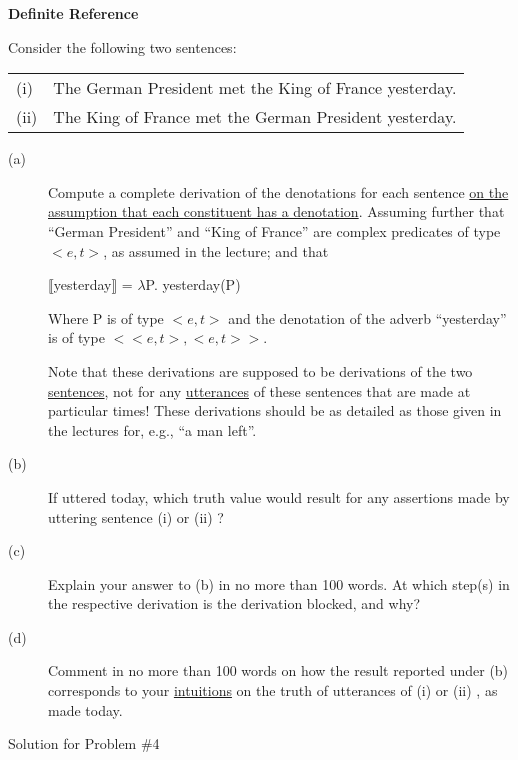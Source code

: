 \documentclass[11pt]{article}
\begin{document}
\begin{problem}{4}
\textbf{Definite Reference}

Consider the following two sentences:

\begin{tabular}{l l}
(i) & The German President met the King of France yesterday. \\
(ii) & The King of France met the German President yesterday. \\
\end{tabular}

\begin{description}
    \item[(a)] Compute a complete derivation of the denotations for each sentence \uline{on the assumption that each constituent has a denotation}. Assuming further that ``German President'' and ``King of France'' are complex predicates of type $<e,t>$, as assumed in the lecture; and that 

    \begin{center}
    $\llbracket$yesterday$\rrbracket$ = $\lambda$P. yesterday(P) 
    \end{center}

    Where P is of type $<e,t>$ and the denotation of the adverb ``yesterday'' is of type $<<e,t>,<e,t>>$.

    Note that these derivations are supposed to be derivations of the two \uline{sentences}, not for any \uline{utterances} of these sentences that are made at particular times!  These derivations should be as detailed as those given in the lectures for, e.g., ``a man left''.

    \item[(b)] If uttered today, which truth value would result for any assertions made by uttering sentence (i) or (ii) ?
    \item[(c)] Explain your answer to (b) in no more than 100 words. At which step(s) in the respective derivation is the derivation blocked, and why?
    \item[(d)] Comment in no more than 100 words on how the result reported under (b) corresponds
to your \uline{intuitions} on the truth of utterances of (i) or (ii) , as made today.
    
\end{description}

\end{problem}

\begin{solution}
Solution for Problem \#4
\end{solution}
\end{document}
